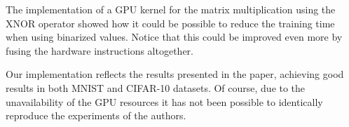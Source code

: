 \documentclass[a4paper]{article}
\numberwithin{equation}{section} %
\numberwithin{figure}{section} %
\numberwithin{table}{section} %
\theoremstyle{definition}
\begin{document}
The implementation of a GPU kernel for the matrix multiplication
using the XNOR operator showed how it could be possible to reduce the
training time when using binarized values. Notice that this could
be improved even more by fusing the hardware instructions altogether.

Our implementation reflects the results presented in the paper,
achieving good results in both MNIST and CIFAR-10 datasets.
Of course, due to the unavailability of the GPU resources it
has not been possible to identically reproduce the experiments
of the authors.


\newpage



\end{document}
